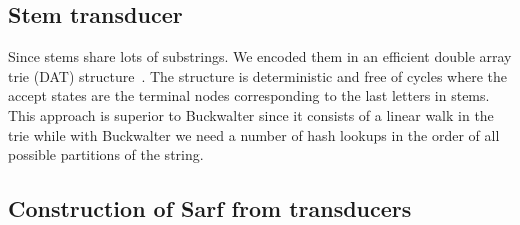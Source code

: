 \documentclass[11pt]{article}
\begin{document}

\subsection{Stem transducer}
\label{sec:stemFSA}


Since stems share lots of substrings. 
We encoded them in
an efficient double array trie (DAT) structure~\cite{Aoe:89}. 
The structure is deterministic and free of cycles where the 
accept states are the terminal nodes corresponding to the last 
letters in stems. 
This approach is superior to Buckwalter since it consists of
a linear walk in the trie while with Buckwalter we need
a number of hash lookups in the order of all possible partitions
of the string.

\subsection{Construction of Sarf from transducers}
\label{sec:ndfsa}

%
%
\end{document}
